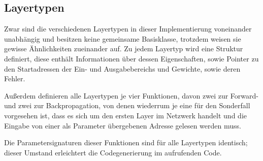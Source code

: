 \documentclass[../main.tex]{subfiles}
\begin{document}
\subsection{Layertypen}
Zwar sind die verschiedenen Layertypen in dieser Implementierung voneinander unabhängig und besitzen keine gemeinsame Basisklasse, trotzdem weisen sie gewisse Ähnlichkeiten zueinander auf. Zu jedem Layertyp wird eine Struktur definiert, diese enthält Informationen über dessen Eigenschaften, sowie Pointer zu den Startadressen der Ein- und Ausgabebereichs und Gewichte, sowie deren Fehler. 

Außerdem definieren alle Layertypen je vier Funktionen, davon zwei zur Forward- und zwei zur Backpropagation, von denen wiederrum je eine für den Sonderfall vorgesehen ist, dass es sich um den ersten Layer im Netzwerk handelt und die Eingabe von einer als Parameter übergebenen Adresse gelesen werden muss. 

Die Parametersignaturen dieser Funktionen sind für alle Layertypen identisch; dieser Umstand erleichtert die Codegenerierung im aufrufenden Code. 
\end{document}
